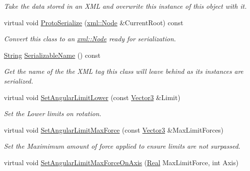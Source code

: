 \begin{DoxyCompactItemize}
\begin{DoxyCompactList}\small\item\em Take the data stored in an XML and overwrite this instance of this object with it. \item\end{DoxyCompactList}\item 
virtual void \hyperlink{classphys_1_1Generic6DofConstraint_a9cf4eb82a625d06116542f6d224cdd69}{ProtoSerialize} (\hyperlink{classphys_1_1xml_1_1Node}{xml::Node} \&CurrentRoot) const 
\begin{DoxyCompactList}\small\item\em Convert this class to an \hyperlink{classphys_1_1xml_1_1Node}{xml::Node} ready for serialization. \item\end{DoxyCompactList}\item 
\hyperlink{namespacephys_aa03900411993de7fbfec4789bc1d392e}{String} \hyperlink{classphys_1_1Generic6DofConstraint_aa015e640a680f54edd0906b6ec684a99}{SerializableName} () const 
\begin{DoxyCompactList}\small\item\em Get the name of the the XML tag this class will leave behind as its instances are serialized. \item\end{DoxyCompactList}\item 
virtual void \hyperlink{classphys_1_1Generic6DofConstraint_a625d093366185366a56a632a88955435}{SetAngularLimitLower} (const \hyperlink{classphys_1_1Vector3}{Vector3} \&Limit)
\begin{DoxyCompactList}\small\item\em Set the Lower limits on rotation. \item\end{DoxyCompactList}\item 
virtual void \hyperlink{classphys_1_1Generic6DofConstraint_a3d7be2f7db602ddce8e090a1f987be2e}{SetAngularLimitMaxForce} (const \hyperlink{classphys_1_1Vector3}{Vector3} \&MaxLimitForces)
\begin{DoxyCompactList}\small\item\em Set the Maximimum amount of force applied to ensure limits are not surpassed. \item\end{DoxyCompactList}\item 
virtual void \hyperlink{classphys_1_1Generic6DofConstraint_a3d06296ebcbeb32965e350499dcc9120}{SetAngularLimitMaxForceOnAxis} (\hyperlink{namespacephys_af7eb897198d265b8e868f45240230d5f}{Real} MaxLimitForce, int Axis)

\end{DoxyCompactItemize}
